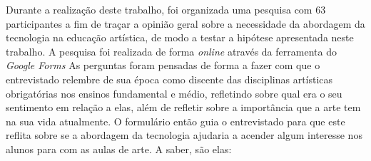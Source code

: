 \documentclass[12pt, a4paper]{article}
\begin{document}




Durante a realização deste trabalho, foi organizada uma pesquisa com 63 participantes a fim de traçar a opinião geral sobre a necessidade da abordagem da tecnologia na educação artística, de modo a testar a hipótese apresentada neste trabalho. A pesquisa foi realizada de forma \emph{online} através da ferramenta do 
\emph{Google Forms}
As perguntas foram pensadas de forma a fazer com que o entrevistado relembre de sua época como discente das disciplinas artísticas obrigatórias nos ensinos fundamental e médio, refletindo sobre qual era o seu sentimento em relação a elas, além de refletir sobre a importância que a arte tem na sua vida atualmente. O formulário então guia o entrevistado para que este reflita sobre se a abordagem da tecnologia ajudaria a acender algum interesse nos alunos para com as aulas de arte. A saber, são elas:
\end{document}
